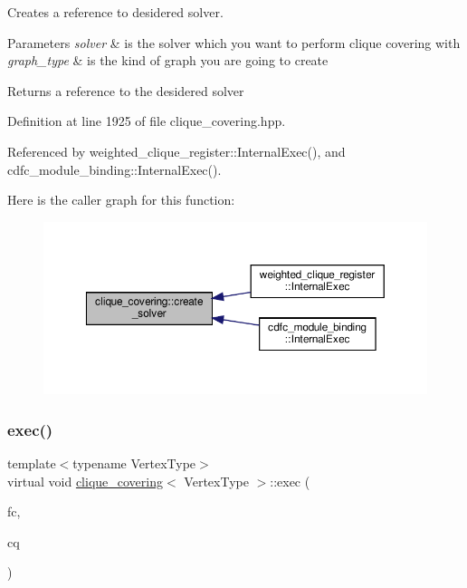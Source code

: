 Creates a reference to desidered solver. 


\begin{DoxyParams}{Parameters}
{\em solver} & is the solver which you want to perform clique covering with \\
\hline
{\em graph\+\_\+type} & is the kind of graph you are going to create \\
\hline
\end{DoxyParams}
\begin{DoxyReturn}{Returns}
a reference to the desidered solver 
\end{DoxyReturn}


Definition at line 1925 of file clique\+\_\+covering.\+hpp.



Referenced by weighted\+\_\+clique\+\_\+register\+::\+Internal\+Exec(), and cdfc\+\_\+module\+\_\+binding\+::\+Internal\+Exec().

Here is the caller graph for this function\+:
\nopagebreak
\begin{figure}[H]
\begin{center}
\leavevmode
\includegraphics[width=350pt]{d3/d9f/classclique__covering_a6527a9e4fa54206327d9fad4194b9acf_icgraph}
\end{center}
\end{figure}
\mbox{\label{classclique__covering_a54c35fc0f400f32f3d412783685150ef}} 
\subsubsection{\texorpdfstring{exec()}{exec()}}
{\footnotesize\ttfamily template$<$typename Vertex\+Type$>$ \\
virtual void \hyperlink{classclique__covering}{clique\+\_\+covering}$<$ Vertex\+Type $>$\+::exec (\begin{DoxyParamCaption}\item[{const \hyperlink{structfilter__clique}{filter\+\_\+clique}$<$ Vertex\+Type $>$ \&}]{fc,  }\item[{\hyperlink{structcheck__clique}{check\+\_\+clique}$<$ Vertex\+Type $>$ \&}]{cq }\end{DoxyParamCaption})\hspace{0.3cm}{\ttfamily [pure virtual]}}



